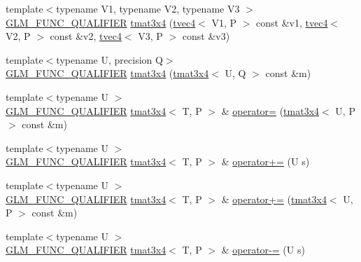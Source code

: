 \begin{DoxyCompactItemize}
\item 
{\footnotesize template$<$typename V1, typename V2, typename V3 $>$ }\\\hyperlink{setup_8hpp_a33fdea6f91c5f834105f7415e2a64407}{G\+L\+M\+\_\+\+F\+U\+N\+C\+\_\+\+Q\+U\+A\+L\+I\+F\+I\+ER} \hyperlink{structglm_1_1detail_1_1tmat3x4_acace185cb00ee79dd090605deefb3dfa}{tmat3x4} (\hyperlink{structglm_1_1detail_1_1tvec4}{tvec4}$<$ V1, P $>$ const \&v1, \hyperlink{structglm_1_1detail_1_1tvec4}{tvec4}$<$ V2, P $>$ const \&v2, \hyperlink{structglm_1_1detail_1_1tvec4}{tvec4}$<$ V3, P $>$ const \&v3)
\item 
{\footnotesize template$<$typename U, precision Q$>$ }\\\hyperlink{setup_8hpp_a33fdea6f91c5f834105f7415e2a64407}{G\+L\+M\+\_\+\+F\+U\+N\+C\+\_\+\+Q\+U\+A\+L\+I\+F\+I\+ER} \hyperlink{structglm_1_1detail_1_1tmat3x4_a3ccf735b71ee0db9bbeb1dd33022a761}{tmat3x4} (\hyperlink{structglm_1_1detail_1_1tmat3x4}{tmat3x4}$<$ U, Q $>$ const \&m)
\item 
{\footnotesize template$<$typename U $>$ }\\\hyperlink{setup_8hpp_a33fdea6f91c5f834105f7415e2a64407}{G\+L\+M\+\_\+\+F\+U\+N\+C\+\_\+\+Q\+U\+A\+L\+I\+F\+I\+ER} \hyperlink{structglm_1_1detail_1_1tmat3x4}{tmat3x4}$<$ T, P $>$ \& \hyperlink{structglm_1_1detail_1_1tmat3x4_aca5ba516f89ecc2713770dccad41578b}{operator=} (\hyperlink{structglm_1_1detail_1_1tmat3x4}{tmat3x4}$<$ U, P $>$ const \&m)
\item 
{\footnotesize template$<$typename U $>$ }\\\hyperlink{setup_8hpp_a33fdea6f91c5f834105f7415e2a64407}{G\+L\+M\+\_\+\+F\+U\+N\+C\+\_\+\+Q\+U\+A\+L\+I\+F\+I\+ER} \hyperlink{structglm_1_1detail_1_1tmat3x4}{tmat3x4}$<$ T, P $>$ \& \hyperlink{structglm_1_1detail_1_1tmat3x4_a3019cac6fe66503e9e8d45f7c1485b20}{operator+=} (U s)
\item 
{\footnotesize template$<$typename U $>$ }\\\hyperlink{setup_8hpp_a33fdea6f91c5f834105f7415e2a64407}{G\+L\+M\+\_\+\+F\+U\+N\+C\+\_\+\+Q\+U\+A\+L\+I\+F\+I\+ER} \hyperlink{structglm_1_1detail_1_1tmat3x4}{tmat3x4}$<$ T, P $>$ \& \hyperlink{structglm_1_1detail_1_1tmat3x4_a9c28e24ea115b67e1901be600e1acac3}{operator+=} (\hyperlink{structglm_1_1detail_1_1tmat3x4}{tmat3x4}$<$ U, P $>$ const \&m)
\item 
{\footnotesize template$<$typename U $>$ }\\\hyperlink{setup_8hpp_a33fdea6f91c5f834105f7415e2a64407}{G\+L\+M\+\_\+\+F\+U\+N\+C\+\_\+\+Q\+U\+A\+L\+I\+F\+I\+ER} \hyperlink{structglm_1_1detail_1_1tmat3x4}{tmat3x4}$<$ T, P $>$ \& \hyperlink{structglm_1_1detail_1_1tmat3x4_a8803004a4da174ad2953f76aa6fb3aa5}{operator-\/=} (U s)

\end{DoxyCompactItemize}
